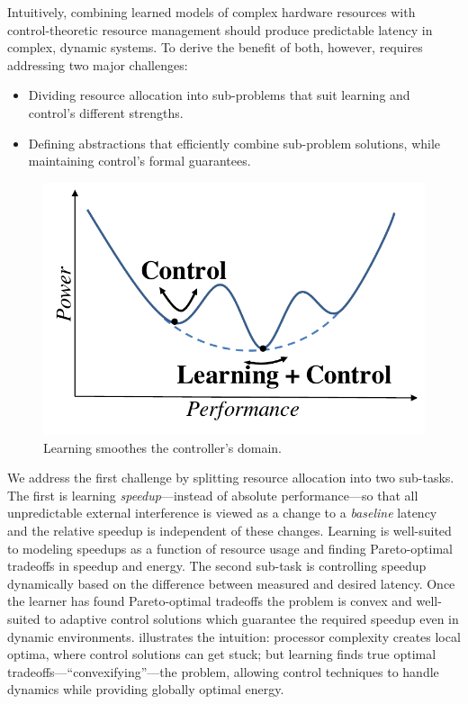 Intuitively, combining learned models of complex hardware resources
with control-theoretic resource management should produce predictable
latency in complex, dynamic systems.  To derive the benefit of
both, however, requires addressing two major challenges:
\begin{itemize}[leftmargin=1.5em]
\item Dividing resource allocation into sub-problems that suit
  learning and control's different strengths.
\item Defining abstractions that efficiently combine sub-problem
  solutions, while maintaining control's formal guarantees.
\end{itemize}

\begin{figure}
\centering
\includegraphics[width=.35\columnwidth]{figures/learning_control_doodle.pdf}
\caption{Learning smoothes the controller's domain.}
\label{fig:learning-control-doodle}
\end{figure}
We address the first challenge by splitting resource allocation into
two sub-tasks.  The first is learning \emph{speedup}---instead of
absolute perf\-ormance---so that all unpredictable external
interference is viewed as a change to a \emph{baseline} latency
and the relative speedup is independent of these changes.  Learning is
well-suited to modeling speedups as a function of resource usage and
finding Pareto-optimal tradeoffs in speedup and energy.  The second
sub-task is controlling speedup dynamically based on the difference
between measured and desired latency.  Once the learner has found
Pareto-optimal tradeoffs the problem is convex and well-suited to
adaptive control solutions which guarantee the required speedup even
in dynamic environments.
illustrates the intuition: processor complexity creates local optima,
where control solutions can get stuck; but learning finds true optimal
tradeoffs---``convexifying''---the problem, allowing control
techniques to handle dynamics while providing globally optimal energy.


